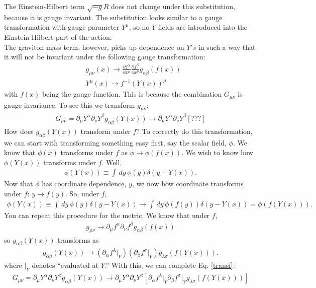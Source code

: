 \documentclass{book}
\theoremstyle{definition}
\newcommand{\p}{\partial}
\newcommand{\al}{\alpha}
\newcommand{\be}{\beta}
\newcommand{\f}[2]{\frac{#1}{#2}}
\newcommand{\lp}{\left(}
\newcommand{\rp}{\right)}
\newcommand{\lb}{\left[}
\newcommand{\rb}{\right]}
\begin{document}
The Einstein-Hilbert term $\sqrt{-g}R$ does not change under this substitution, because it is gauge invariant. The substitution looks similar to a gauge transformation with gauge parameter $Y^\mu$, so no $Y$ fields are introduced into the Einstein-Hilbert part of the action.\\

The graviton mass term, however, picks up dependence on $Y's$ in such a way that it will not be invariant under the following gauge transformation:
\begin{align}
&g_{\mu\nu}(x)\to\f{\p f^\al}{\p x^\mu} \f{\p f^\be}{\p x^\nu} g_{\al\be}(f(x))\\
& Y^\mu(x) \to f^{-1}(Y(x))^\mu
\end{align}
with $f(x)$ being the gauge function. This is because the combination $G_{\mu\nu}$ is gauge invariance. To see this we transform $g_{\mu\nu}$:
\begin{align}\label{transf}
G_{\mu\nu} = \p_\mu Y^\al \p_\nu Y^\be g_{\al\be}(Y(x)) \to \p_\mu Y^\al \p_\nu Y^\be [???]
\end{align}
How does $g_{\al\be}(Y(x))$ transform under $f$? To correctly do this transformation, we can start with transforming something easy first, say the scalar field, $\phi$. We know that $\phi(x)$ transforms under $f$ as $\phi \to \phi(f(x))$. We wish to know how $\phi(Y(x))$ transforms under $f$. Well,
\begin{align}
\phi(Y(x)) \equiv \int \,dy \, \phi(y)\delta(y - Y(x)).
\end{align}
Now that $\phi$ has coordinate dependence, $y$, we now how coordinate transforms under $f$: $y\to f(y)$. So, under $f$,
\begin{align}
\phi(Y(x)) \equiv \int \,dy \, \phi(y)\delta(y - Y(x)) \to  \int \,dy \, \phi(f(y))\delta(y - Y(x)) = \phi(f(Y(x))).
\end{align}
You can repeat this procedure for the metric. We know that under $f$,
\begin{align}
g_{\mu\nu} \to \p_\mu f^\al \p_\nu f^\be g_{\al\be}(f(x))
\end{align}
so $g_{\al\be}(Y(x))$ transforms as
\begin{align}
g_{\al\beta}(Y(x)) \to \lp\p_\al f^\lambda\vert_Y\rp \lp \p_\be f^\sigma\vert_Y\rp g_{\lambda\sigma}(f(Y(x))). 
\end{align}
where $\vert_Y$ denotes ``evaluated at $Y$.'' With this, we can complete Eq. \eqref{transf}:
\begin{align}
G_{\mu\nu} = \p_\mu Y^\al \p_\nu Y^\be g_{\al\be}(Y(x)) \to \p_\mu Y^\al \p_\nu Y^\be \lb \p_\al f^\lambda\vert_Y \p_\beta f^\sigma\vert_Y g_{\lambda\sigma}(f(Y(x))) \rb
\end{align}
\end{document}
